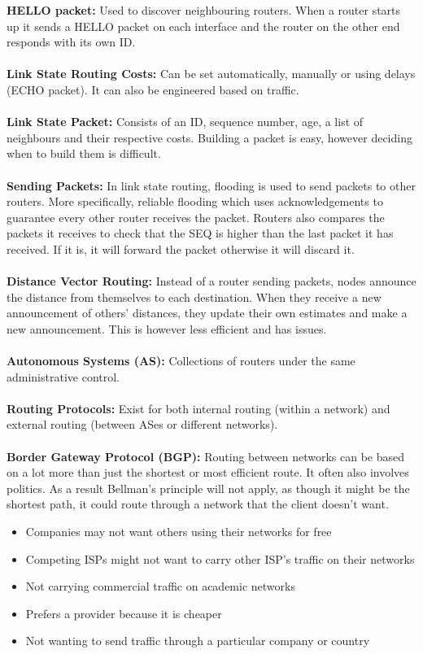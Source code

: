 \documentclass[a4paper,10pt]{article}
\begin{document}
\textcolor{Melon}{\textbf{HELLO packet:}} Used to discover neighbouring routers. When a router starts up it sends a HELLO packet on each interface and the router on the other end responds with its own ID. \\\\
\textcolor{Melon}{\textbf{Link State Routing Costs:}} Can be set automatically, manually or using delays (ECHO packet). It can also be engineered based on traffic. \\\\
\textcolor{Melon}{\textbf{Link State Packet:}} Consists of an ID, sequence number, age, a list of neighbours and their respective costs. Building a packet is easy, however deciding when to build them is difficult. \\\\
\textcolor{Melon}{\textbf{Sending Packets:}} In link state routing, flooding is used to send packets to other routers. More specifically, reliable flooding which uses acknowledgements to guarantee every other router receives the packet. Routers also compares the packets it receives to check that the SEQ is higher than the last packet it has received. If it is, it will forward the packet otherwise it will discard it. \\\\
\textcolor{Melon}{\textbf{Distance Vector Routing:}} Instead of a router sending packets, nodes announce the distance from themselves to each destination. When they receive a new announcement of others' distances, they update their own estimates and make a new announcement. This is however less efficient and has issues. \\\\
\textcolor{Melon}{\textbf{Autonomous Systems (AS):}} Collections of routers under the same administrative control. \\\\
\textcolor{Melon}{\textbf{Routing Protocols:}} Exist for both internal routing (within a network) and external routing (between ASes or different networks). \\\\
\textcolor{Melon}{\textbf{Border Gateway Protocol (BGP):}} Routing between networks can be based on a lot more than just the shortest or most efficient route. It often also involves politics. As a result Bellman's principle will not apply, as though it might be the shortest path, it could route through a network that the client doesn't want. 
\begin{itemize}
	\item Companies may not want others using their networks for free 
	\item Competing ISPs might not want to carry other ISP's traffic on their networks 
	\item Not carrying commercial traffic on academic networks 
	\item Prefers a provider because it is cheaper 
	\item Not wanting to send traffic through a particular company or country
\end{itemize}
\end{document}
